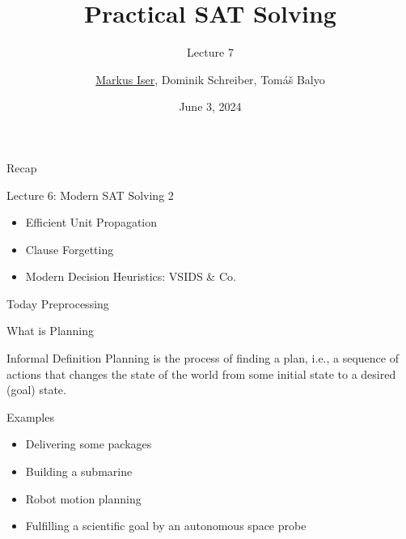 \documentclass[t]{sdqbeamer}
\title[SAT Solving]{Practical SAT Solving}
\subtitle{Lecture 7}
\author{\underline{Markus Iser}, Dominik Schreiber, Tom\'a\v{s} Balyo}
\date{June 3, 2024}
\begin{document}
\begin{frame}
	\thispagestyle{empty}
	\titlepage
\end{frame}


\begin{frame}{Recap}
    \begin{block}{Lecture 6: Modern SAT Solving 2}
		\begin{itemize}\setlength{\itemsep}{1ex}
			\item Efficient Unit Propagation
			\item Clause Forgetting
			\item Modern Decision Heuristics: VSIDS \& Co.
		\end{itemize}
    \end{block}
	\begin{block}{Today}
        Preprocessing
	\end{block}
\end{frame}

\begin{frame}{What is Planning}
\begin{block}{Informal Definition}
Planning is the process of finding a plan, i.e., a sequence of actions that changes the
state of the world from some initial state to a desired (goal) state.
\end{block}
Examples
\begin{itemize}
	\item Delivering some packages
	\item Building a submarine
	\item Robot motion planning
	\item Fulfilling a scientific goal by an autonomous space probe
\end{itemize}
\end{frame}
\end{document}

